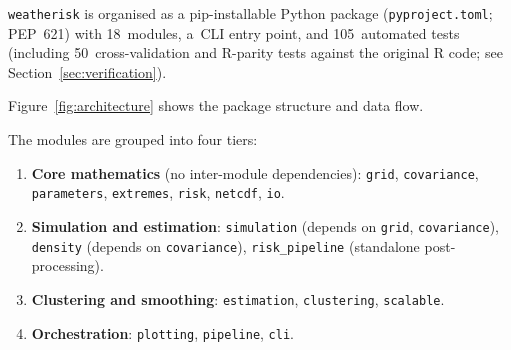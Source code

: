 \documentclass[a4paper]{elsarticle}
\begin{document}
\begin{sloppypar}
\texttt{weatherisk} is organised as a pip-installable
Python package (\texttt{pyproject.toml}; PEP~621)
with 18~modules, a~CLI entry point, and 105~automated tests
(including 50~cross-validation and R-parity tests against the
original R code; see Section~\ref{sec:verification}).
\end{sloppypar}
Figure~\ref{fig:architecture} shows the package structure and data flow.

The modules are grouped into four tiers:
\begin{enumerate}
\item \textbf{Core mathematics}
  (no inter-module dependencies):
  \texttt{grid}, \texttt{covariance},
  \texttt{para\-meters}, \texttt{extremes},
  \texttt{risk}, \texttt{netcdf}, \texttt{io}.
\item \textbf{Simulation and estimation}:
  \texttt{simu\-lation}
  (depends on \texttt{grid},
  \texttt{covar\-iance}),
  \texttt{density}
  (depends on \texttt{covar\-iance}),
  \texttt{risk\_pipe\-line}
  (standalone post-processing).
\item \textbf{Clustering and smoothing}:
  \texttt{estimation}, \texttt{clustering}, \texttt{scalable}.
\item \textbf{Orchestration}:
  \texttt{plotting}, \texttt{pipeline}, \texttt{cli}.
\end{enumerate}
\end{document}

